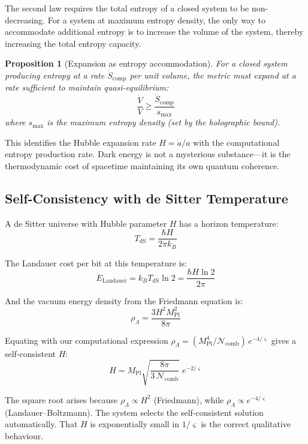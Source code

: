 \documentclass[11pt,a4paper]{article}
\newtheorem{proposition}[theorem]{Proposition}
\theoremstyle{definition}
\newcommand{\gs}{\varsigma}                %
\newcommand{\Mpl}{M_{\text{Pl}}}
\newcommand{\rhoL}{\rho_{\Lambda}}
\newcommand{\TdS}{T_{\text{dS}}}
\newcommand{\Ncomb}{\mathcal{N}_{\text{comb}}}
\begin{document}
The second law requires the total entropy of a closed system to be non-decreasing. For a system at maximum entropy density, the only way to accommodate additional entropy is to increase the volume of the system, thereby increasing the total entropy capacity.

\begin{proposition}[Expansion as entropy accommodation]
For a closed system producing entropy at a rate $\dot{S}_{\text{comp}}$ per unit volume, the metric must expand at a rate sufficient to maintain quasi-equilibrium:
\begin{equation}
    \frac{\dot{V}}{V} \geq \frac{\dot{S}_{\text{comp}}}{s_{\max}}
\end{equation}
where $s_{\max}$ is the maximum entropy density (set by the holographic bound).
\end{proposition}

This identifies the Hubble expansion rate $H = \dot{a}/a$ with the computational entropy production rate. Dark energy is not a mysterious substance---it is the thermodynamic cost of spacetime maintaining its own quantum coherence.

\subsection{Self-Consistency with de Sitter Temperature}

A de Sitter universe with Hubble parameter $H$ has a horizon temperature:
\begin{equation}
    \TdS = \frac{\hbar H}{2\pi k_B}
\end{equation}

The Landauer cost per bit at this temperature is:
\begin{equation}
    E_{\text{Landauer}} = k_B \TdS \ln 2 = \frac{\hbar H \ln 2}{2\pi}
\end{equation}

And the vacuum energy density from the Friedmann equation is:
\begin{equation}
    \rhoL = \frac{3H^2 \Mpl^2}{8\pi}
\end{equation}

Equating with our computational expression $\rhoL = (\Mpl^4/\Ncomb)\,e^{-4/\gs}$ gives a self-consistent $H$:
\begin{equation}
    H = \Mpl\sqrt{\frac{8\pi}{3\,\Ncomb}} \; e^{-2/\gs}
\end{equation}

The square root arises because $\rhoL \propto H^2$ (Friedmann), while $\rhoL \propto e^{-4/\gs}$ (Landauer--Boltzmann). The system selects the self-consistent solution automatically. That $H$ is exponentially small in $1/\gs$ is the correct qualitative behaviour.
\end{document}
